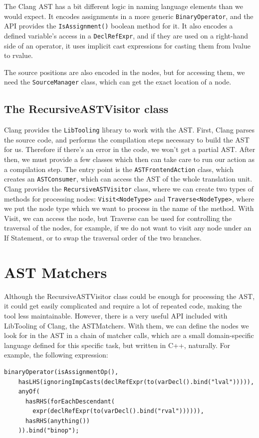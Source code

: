 \documentclass[oneside,12pt,a4paper]{book}
\begin{document}
The Clang AST has a bit different logic in naming language elements than we would expect. It encodes assignments in a more generic \texttt{BinaryOperator}, and the API provides the \texttt{IsAssignment()} boolean method for it. It also encodes a defined variable's access in a \texttt{DeclRefExpr}, and if they are used on a right-hand side of an operator, it uses implicit cast expressions for casting them from lvalue to rvalue.

The source positions are also encoded in the nodes, but for accessing them, we need the \texttt{SourceManager} class, which can get the exact location of a node. 

\subsection{The RecursiveASTVisitor class}

Clang provides the \texttt{LibTooling} library to work with the AST. First, Clang parses the source code, and performs the compilation steps necessary to build the AST for us. Therefore if there's an error in the code, we won't get a partial AST. After then, we must provide a few classes which then can take care to run our action as a compilation step. The entry point is the \texttt{ASTFrontendAction} class, which creates an \texttt{ASTConsumer}, which can access the AST of the whole translation unit. Clang provides the \texttt{RecursiveASTVisitor} class, where we can create two types of methods for processing nodes: \texttt{Visit<NodeType>} and \texttt{Traverse<NodeType>}, where we put the node type which we want to process in the name of the method. With Visit, we can access the node, but Traverse can be used for controlling the traversal of the nodes, for example, if we do not want to visit any node under an If Statement, or to swap the traversal order of the two branches. 

\section{AST Matchers}

Although the RecursiveASTVisitor class could be enough for processing the AST, it could get easily complicated and require a lot of repeated code, making the tool less maintainable. However, there is a very useful API included with LibTooling of Clang, the ASTMatchers. With them, we can define the nodes we look for in the AST in a chain of matcher calls, which are a small domain-specific language defined for this specific task, but written in C++, naturally. For example, the following expression:
\begin{lstlisting}
binaryOperator(isAssignmentOp(),
    hasLHS(ignoringImpCasts(declRefExpr(to(varDecl().bind("lval"))))),
    anyOf(
      hasRHS(forEachDescendant(
      	expr(declRefExpr(to(varDecl().bind("rval")))))),
      hasRHS(anything())
    )).bind("binop");
\end{lstlisting}
\end{document}
